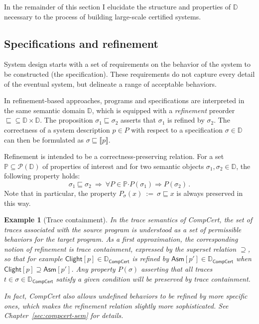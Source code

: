 \documentclass[11pt,oneside,draft]{book}
\newtheorem{example}[theorem]{Example}
\theoremstyle{definition}
\newcommand{\kw}[1]{\ensuremath{ \mathsf{#1} }}
\newcommand{\bdot}{\boldsymbol{\cdot}}
\newcommand{\refby}{\sqsubseteq} %
\begin{document}
In the remainder of this section I elucidate
the structure and properties of $\mathbb{D}$
necessary to the process of building
large-scale certified systems.


\subsection{Specifications and refinement} %

System design starts with a set of requirements
on the behavior of the system to be constructed
(the specification).
These requirements do not capture every detail
of the eventual system,
but delineate a range of acceptable behaviors.

In refinement-based approaches,
programs and specifications are interpreted in the same
semantic domain $\mathbb{D}$,
which is equipped with a \emph{refinement} preorder
${\refby} \subseteq \mathbb{D} \times \mathbb{D}$.
The proposition $\sigma_1 \refby \sigma_2$
asserts that $\sigma_1$ is refined by $\sigma_2$.
The correctness of a system description $p \in P$
with respect to a specification $\sigma \in \mathbb{D}$
can then be formulated as
$\sigma \refby \llbracket p \rrbracket$.

Refinement is intended to be a correctness-preserving relation.
For a set
$\mathbb{P} \subseteq \mathcal{P}(\mathbb{D})$
of properties of interest
and for two semantic objects $\sigma_1, \sigma_2 \in \mathbb{D}$,
the following property holds:
\[
  \sigma_1 \refby \sigma_2 \:\Rightarrow\:
  \forall P \in \mathbb{P} \bdot
    P(\sigma_1) \Rightarrow P(\sigma_2) \,.
\]
Note that in particular,
the property $P_\sigma(x) \: := \: \sigma \refby x$
is always preserved in this way.

\begin{example}[Trace containment]
In the trace semantics of CompCert,
the set of traces associated with the source program
is understood as a set of \emph{permissible} behaviors
for the target program.
As a first approximation,
the corresponding notion of refinement is
\emph{trace containment},
expressed by the superset relation $\supseteq$,
so that for example
$\kw{Clight}[p] \in \mathbb{D}_\kw{CompCert}$
is refined by
$\kw{Asm}[p'] \in \mathbb{D}_\kw{CompCert}$
when
$
  \kw{Clight}[p] \supseteq \kw{Asm}[p']
$.
Any property $P(\sigma)$
asserting that \emph{all} traces
$t \in \sigma \in \mathbb{D}_\kw{CompCert}$
satisfy a given condition
will be preserved by trace containment.

In fact,
CompCert also allows undefined behaviors
to be refined by more specific ones,
which makes the refinement relation
slightly more sophisticated.
See Chapter~\ref{sec:compcert-sem} for details.
\end{example}
\end{document}
